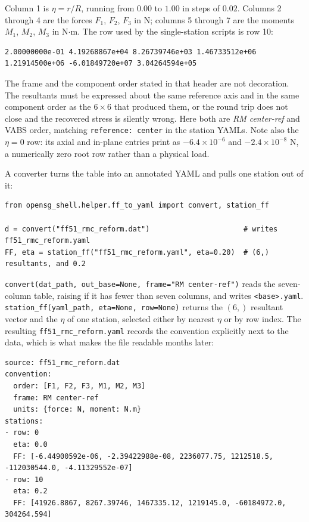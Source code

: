 Column 1 is $\eta = r/R$, running from $0.00$ to $1.00$ in steps of $0.02$.
Columns 2 through 4 are the forces $F_1$, $F_2$, $F_3$ in N; columns 5 through 7
are the moments $M_1$, $M_2$, $M_3$ in N$\cdot$m. The row used by the
single-station scripts is row 10:

\begin{lstlisting}[style=shellst,basicstyle=\ttfamily\tiny]
2.00000000e-01 4.19268867e+04 8.26739746e+03 1.46733512e+06 1.21914500e+06 -6.01849720e+07 3.04264594e+05
\end{lstlisting}

The frame and the component order stated in that header are not decoration. The
resultants must be expressed about the same reference axis and in the same
component order as the $6\times6$ that produced them, or the round trip does not
close and the recovered stress is silently wrong. Here both are \emph{RM
center-ref} and VABS order, matching \texttt{reference: center} in the station
YAMLs. Note also the $\eta = 0$ row: its axial and in-plane entries print as
$-6.4\times10^{-6}$ and $-2.4\times10^{-8}$ N, a numerically zero root row
rather than a physical load.

A converter turns the table into an annotated YAML and pulls one station out of
it:

\begin{lstlisting}[style=opensg,caption={ff51\_rmc\_reform.yaml: the FF table as a self-describing file.},basicstyle=\ttfamily\footnotesize]
from opensg_shell.helper.ff_to_yaml import convert, station_ff

d = convert("ff51_rmc_reform.dat")                      # writes ff51_rmc_reform.yaml
FF, eta = station_ff("ff51_rmc_reform.yaml", eta=0.20)  # (6,) resultants, and 0.2
\end{lstlisting}

\texttt{convert(dat\_path, out\_base=None, frame="RM center-ref")} reads the
seven-column table, raising if it has fewer than seven columns, and writes
\texttt{<base>.yaml}. \texttt{station\_ff(yaml\_path, eta=None, row=None)}
returns the $(6,)$ resultant vector and the $\eta$ of one station, selected
either by nearest $\eta$ or by row index. The resulting
\texttt{ff51\_rmc\_reform.yaml} records the convention explicitly next to the
data, which is what makes the file readable months later:

\begin{lstlisting}[style=shellst,basicstyle=\ttfamily\scriptsize]
source: ff51_rmc_reform.dat
convention:
  order: [F1, F2, F3, M1, M2, M3]
  frame: RM center-ref
  units: {force: N, moment: N.m}
stations:
- row: 0
  eta: 0.0
  FF: [-6.44900592e-06, -2.39422988e-08, 2236077.75, 1212518.5, -112030544.0, -4.11329552e-07]
- row: 10
  eta: 0.2
  FF: [41926.8867, 8267.39746, 1467335.12, 1219145.0, -60184972.0, 304264.594]
\end{lstlisting}

